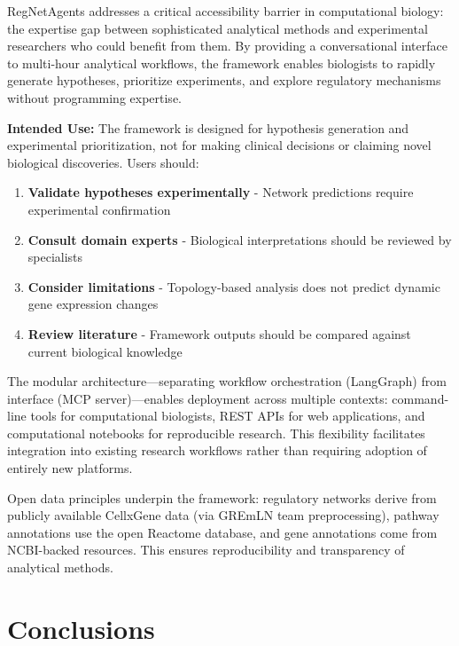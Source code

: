 \documentclass[11pt]{article}
\begin{document}
RegNetAgents addresses a critical accessibility barrier in computational biology: the expertise gap between sophisticated analytical methods and experimental researchers who could benefit from them. By providing a conversational interface to multi-hour analytical workflows, the framework enables biologists to rapidly generate hypotheses, prioritize experiments, and explore regulatory mechanisms without programming expertise.

\textbf{Intended Use:} The framework is designed for hypothesis generation and experimental prioritization, not for making clinical decisions or claiming novel biological discoveries. Users should:
\begin{enumerate}
\item \textbf{Validate hypotheses experimentally} - Network predictions require experimental confirmation
\item \textbf{Consult domain experts} - Biological interpretations should be reviewed by specialists
\item \textbf{Consider limitations} - Topology-based analysis does not predict dynamic gene expression changes
\item \textbf{Review literature} - Framework outputs should be compared against current biological knowledge
\end{enumerate}

The modular architecture---separating workflow orchestration (LangGraph) from interface (MCP server)---enables deployment across multiple contexts: command-line tools for computational biologists, REST APIs for web applications, and computational notebooks for reproducible research. This flexibility facilitates integration into existing research workflows rather than requiring adoption of entirely new platforms.

Open data principles underpin the framework: regulatory networks derive from publicly available CellxGene data (via GREmLN team preprocessing), pathway annotations use the open Reactome database, and gene annotations come from NCBI-backed resources. This ensures reproducibility and transparency of analytical methods.

\section{Conclusions}
\end{document}
